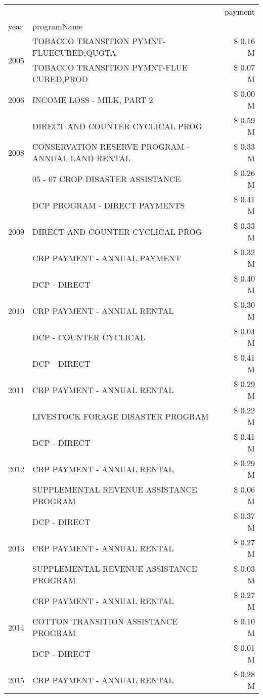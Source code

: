 \begin{tabular}{llr}
\toprule
 &  & payment \\
year & programName &  \\
\midrule
\multirow[t]{2}{*}{2005} & TOBACCO TRANSITION PYMNT-FLUECURED,QUOTA & \$ 0.16 M \\
 & TOBACCO TRANSITION PYMNT-FLUE CURED,PROD & \$ 0.07 M \\
\cline{1-3}
2006 & INCOME LOSS - MILK, PART 2 & \$ 0.00 M \\
\cline{1-3}
\multirow[t]{3}{*}{2008} & DIRECT AND COUNTER CYCLICAL PROG & \$ 0.59 M \\
 & CONSERVATION RESERVE PROGRAM - ANNUAL LAND RENTAL & \$ 0.33 M \\
 & 05 - 07 CROP DISASTER ASSISTANCE & \$ 0.26 M \\
\cline{1-3}
\multirow[t]{3}{*}{2009} & DCP PROGRAM - DIRECT PAYMENTS & \$ 0.41 M \\
 & DIRECT AND COUNTER CYCLICAL PROG & \$ 0.33 M \\
 & CRP PAYMENT - ANNUAL PAYMENT & \$ 0.32 M \\
\cline{1-3}
\multirow[t]{3}{*}{2010} & DCP - DIRECT & \$ 0.40 M \\
 & CRP PAYMENT - ANNUAL RENTAL & \$ 0.30 M \\
 & DCP - COUNTER CYCLICAL & \$ 0.04 M \\
\cline{1-3}
\multirow[t]{3}{*}{2011} & DCP - DIRECT & \$ 0.41 M \\
 & CRP PAYMENT - ANNUAL RENTAL & \$ 0.29 M \\
 & LIVESTOCK FORAGE DISASTER PROGRAM & \$ 0.22 M \\
\cline{1-3}
\multirow[t]{3}{*}{2012} & DCP - DIRECT & \$ 0.41 M \\
 & CRP PAYMENT - ANNUAL RENTAL & \$ 0.29 M \\
 & SUPPLEMENTAL REVENUE ASSISTANCE PROGRAM & \$ 0.06 M \\
\cline{1-3}
\multirow[t]{3}{*}{2013} & DCP - DIRECT & \$ 0.37 M \\
 & CRP PAYMENT - ANNUAL RENTAL & \$ 0.27 M \\
 & SUPPLEMENTAL REVENUE ASSISTANCE PROGRAM & \$ 0.03 M \\
\cline{1-3}
\multirow[t]{3}{*}{2014} & CRP PAYMENT - ANNUAL RENTAL & \$ 0.27 M \\
 & COTTON TRANSITION ASSISTANCE PROGRAM & \$ 0.10 M \\
 & DCP - DIRECT & \$ 0.01 M \\
\cline{1-3}
\multirow[t]{3}{*}{2015} & CRP PAYMENT - ANNUAL RENTAL & \$ 0.28 M \\

\end{tabular}

